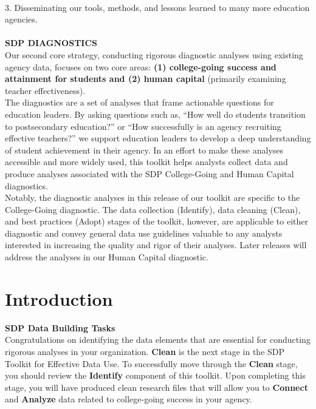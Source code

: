 \documentclass[12pt]{article}
\begin{document}
 \\

3. Disseminating our tools, methods, and lessons learned to many more education agencies. \\

 \\


\textbf{SDP DIAGNOSTICS}\\

Our second core strategy, conducting rigorous diagnostic analyses using existing agency data, focuses on two core areas: \textbf{(1) college-going
success and attainment for students and (2) human capital} (primarily examining teacher effectiveness).\\

The diagnostics are a set of analyses that frame actionable questions for education leaders.  By asking questions such as, ``How well do students transition to postsecondary education?'' or ``How successfully is an agency recruiting effective teachers?'' we support education leaders to develop a deep understanding of student achievement in their agency. In an effort to make these analyses accessible and more widely used, this toolkit helps analysts collect data and produce analyses associated with the SDP College-Going and Human Capital diagnostics.  \\

Notably, the diagnostic analyses in this release of our toolkit are specific to the College-Going diagnostic.  The data collection (Identify), data cleaning (Clean), and best practices (Adopt) stages of the toolkit, however, are applicable to either diagnostic and convey general data use guidelines valuable to any analysts interested in increasing the quality and rigor of their analyses. Later releases will address the analyses in our Human Capital diagnostic.

\section{Introduction}
\noindent \large \textbf{SDP Data Building Tasks} \\
\normalsize
Congratulations on identifying the data elements that are essential for conducting rigorous analyses in your 
organization. \textbf{Clean} is the next stage in the SDP Toolkit for Effective Data Use.  To successfully move through the 
\textbf{Clean} stage, you should review the  \textbf{Identify} component of this toolkit.  Upon completing this stage, you will have 
produced clean research files that will allow you to \textbf{Connect} and \textbf{Analyze} data related to college-going success in your 
agency.  \\
\end{document}
